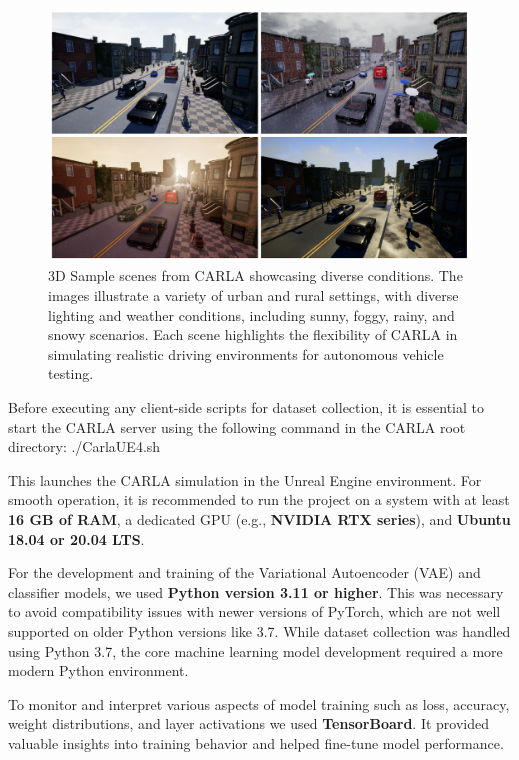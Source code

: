 \begin{figure}[h]
    \centering
    \includegraphics[width=0.9\linewidth]{img/carla/CARLA_Environment.png}
    \caption[CARLA scenes under diverse conditions]{3D Sample scenes from CARLA showcasing diverse conditions. The images illustrate a variety of urban and rural settings, with diverse lighting and weather conditions, including sunny, foggy, rainy, and snowy scenarios. Each scene highlights the flexibility of CARLA in simulating realistic driving environments for autonomous vehicle testing.}
    \label{fig:carla_scenes}
\end{figure}



Before executing any client-side scripts for dataset collection, it is essential to start the CARLA server using the following command in the CARLA root directory: ./CarlaUE4.sh


This launches the CARLA simulation in the Unreal Engine environment. For smooth operation, it is recommended to run the project on a system with at least \textbf{16 GB of RAM}, a dedicated GPU (e.g., \textbf{NVIDIA RTX series}), and \textbf{Ubuntu 18.04 or 20.04 LTS}. 

For the development and training of the Variational Autoencoder (VAE) and classifier models, we used \textbf{Python version 3.11 or higher}. This was necessary to avoid compatibility issues with newer versions of PyTorch, which are not well supported on older Python versions like 3.7. While dataset collection was handled using Python 3.7, the core machine learning model development required a more modern Python environment.  

To monitor and interpret various aspects of model training such as loss, accuracy, weight distributions, and layer activations we used \textbf{TensorBoard}. It provided valuable insights into training behavior and helped fine-tune model performance.

